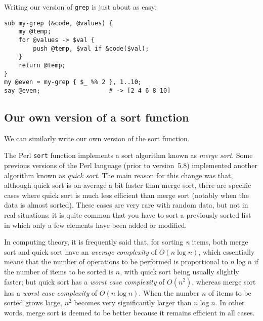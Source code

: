 Writing our version of {\tt grep} is just about as 
easy:
\begin{verbatim}
sub my-grep (&code, @values) { 
    my @temp;
    for @values -> $val {
        push @temp, $val if &code($val);
    }
    return @temp;
}
my @even = my-grep { $_ %% 2 }, 1..10; 
say @even;                   # -> [2 4 6 8 10]
\end{verbatim}

\subsection{Our own version of a sort function}
\label{combsort}

We can similarly write our own version of the sort 
function. 

The Perl {\tt sort} function implements a sort 
algorithm known as \emph{merge sort}.  Some 
previous versions of the Perl language (prior to 
version~5.8) implemented another algorithm known 
as \emph{quick sort}. The main reason for this 
change was that, although quick sort is on average  
a bit faster than merge sort, there are specific 
cases where quick sort is much less efficient than 
merge sort (notably when the data is almost sorted). 
These cases are very rare with random data, but not 
in real situations: it is quite common that you have 
to sort a previously sorted list in which only a 
few elements have been added or modified.

In computing theory, it is frequently said that, for 
sorting \emph{n} items, both merge sort and quick 
sort have an \emph{average complexity} of $O(n \log n)$, 
which essentially means that the number of operations 
to be performed is proportional to $n \log n$ if 
the number of items to be sorted is $n$, 
with quick sort being usually slightly faster; but 
quick sort has a \emph{worst case complexity} of 
$O(n^{2})$, whereas merge sort has a \emph{worst case 
complexity} of $O(n \log n)$. When the number $n$ of 
items to be sorted grows large, $n^{2}$ becomes 
very significantly larger than $n \log n$. In other 
words, merge sort is deemed to be better because it 
remains efficient in all cases.

